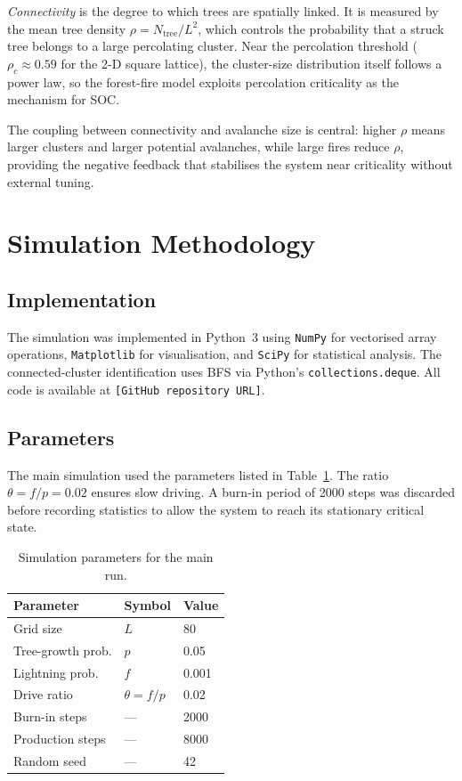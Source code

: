 \documentclass[12pt,a4paper]{article}
\begin{document}
\emph{Connectivity} is the degree to which trees are spatially linked.
It is measured by the mean tree density $\rho = N_{\text{tree}}/L^2$, which
controls the probability that a struck tree belongs to a large percolating
cluster.
Near the percolation threshold ($\rho_c \approx 0.59$ for the 2-D square
lattice), the cluster-size distribution itself follows a power law, so the
forest-fire model exploits percolation criticality as the mechanism for SOC.

The coupling between connectivity and avalanche size is central: higher $\rho$
means larger clusters and larger potential avalanches, while large fires
reduce $\rho$, providing the negative feedback that stabilises the system
near criticality without external tuning.

\clearpage
\section{Simulation Methodology}
\label{sec:simulation}

\subsection{Implementation}

The simulation was implemented in Python~3 using \texttt{NumPy} for vectorised
array operations, \texttt{Matplotlib} for visualisation, and \texttt{SciPy}
for statistical analysis.
The connected-cluster identification uses BFS via Python's \texttt{collections.deque}.
All code is available at \texttt{[GitHub repository URL]}.

\subsection{Parameters}

The main simulation used the parameters listed in Table~\ref{tab:params}.
The ratio $\theta=f/p=0.02$ ensures slow driving.
A burn-in period of 2000 steps was discarded before recording statistics to
allow the system to reach its stationary critical state.

\begin{table}[h]
\centering
\caption{Simulation parameters for the main run.}
\label{tab:params}
\begin{tabular}{lll}
\toprule
Parameter & Symbol & Value \\
\midrule
Grid size           & $L$    & 80   \\
Tree-growth prob.   & $p$    & 0.05 \\
Lightning prob.     & $f$    & 0.001 \\
Drive ratio         & $\theta=f/p$ & 0.02 \\
Burn-in steps       & ---    & 2000 \\
Production steps    & ---    & 8000 \\
Random seed         & ---    & 42   \\
\bottomrule
\end{tabular}
\end{table}
\end{document}
